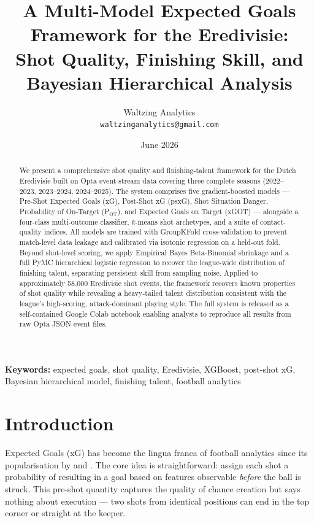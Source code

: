 \documentclass[12pt,a4paper]{article}
\title{\textbf{A Multi-Model Expected Goals Framework for the Eredivisie:\\
Shot Quality, Finishing Skill, and\\
Bayesian Hierarchical Analysis}}
\author{
    Waltzing Analytics\\
    \texttt{waltzinganalytics@gmail.com}
}
\date{June 2026}
\begin{document}
\maketitle
\thispagestyle{empty}

\begin{abstract}
\noindent
We present a comprehensive shot quality and finishing-talent framework for the Dutch Eredivisie built on Opta event-stream data covering three complete seasons (2022--2023, 2023--2024, 2024--2025). The system comprises five gradient-boosted models --- Pre-Shot Expected Goals (xG), Post-Shot xG (psxG), Shot Situation Danger, Probability of On-Target (P$_{\text{OT}}$), and Expected Goals on Target (xGOT) --- alongside a four-class multi-outcome classifier, $k$-means shot archetypes, and a suite of contact-quality indices. All models are trained with GroupKFold cross-validation to prevent match-level data leakage and calibrated via isotonic regression on a held-out fold. Beyond shot-level scoring, we apply Empirical Bayes Beta-Binomial shrinkage and a full PyMC hierarchical logistic regression to recover the league-wide distribution of finishing talent, separating persistent skill from sampling noise. Applied to approximately 58,000 Eredivisie shot events, the framework recovers known properties of shot quality while revealing a heavy-tailed talent distribution consistent with the league's high-scoring, attack-dominant playing style. The full system is released as a self-contained Google Colab notebook enabling analysts to reproduce all results from raw Opta JSON event files.
\end{abstract}

\vspace{0.5em}
\noindent\textbf{Keywords:} expected goals, shot quality, Eredivisie, XGBoost, post-shot xG, Bayesian hierarchical model, finishing talent, football analytics

\newpage
\tableofcontents
\newpage

\section{Introduction}
\label{sec:intro}

Expected Goals (xG) has become the lingua franca of football analytics since its popularisation by \citet{caley2013} and \citet{rathke2017}. The core idea is straightforward: assign each shot a probability of resulting in a goal based on features observable \emph{before} the ball is struck. This pre-shot quantity captures the quality of chance creation but says nothing about execution --- two shots from identical positions can end in the top corner or straight at the keeper.
\end{document}
